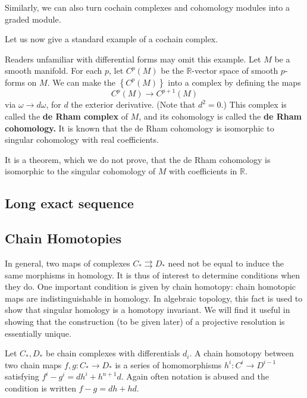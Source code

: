 Similarly, we can also turn cochain complexes and cohomology
modules into a
graded module.

Let us now give a standard example of a cochain complex.
\begin{example} Readers unfamiliar with differential
forms may omit this example. Let $M$ be a smooth manifold. For each $p$, let
$C^p(M)$ be the $\mathbb{R}$-vector space of smooth $p$-forms on $M$.
We can make the $\left\{C^p(M)\right\}$ into a complex by defining the maps
\[ C^p(M) \to C^{p+1}(M)  \]
via $\omega \to d \omega$, for $d$ the exterior derivative. 
(Note that $d^2 = 0$.)  This complex is called the \textbf{de Rham complex} of
$M$, and its cohomology is called the \textbf{de Rham cohomology.} It is known
that the de Rham cohomology is isomorphic to singular cohomology with real
coefficients. 

It is a theorem, which we do not prove, that the de Rham cohomology is
isomorphic to the singular cohomology of $M$ with coefficients in $\mathbb{R}$.
\end{example} 

\subsection{Long exact sequence}

\subsection{Chain Homotopies}

In general, two maps of complexes $C_* \rightrightarrows D_*$ need not be
equal to induce the same morphisms in homology. It is thus of interest to
determine conditions when they do. One important condition is given by chain
homotopy: chain homotopic maps are indistinguishable in homology. In algebraic
topology, this fact is used to show that singular homology is a homotopy
invariant.
We will find it useful in showing that the construction (to be given later) of a
projective resolution is essentially unique.

\begin{definition} Let $C_*, D_*$ be chain complexes with differentials $d_i$. A chain homotopy between two chain maps
$f,g:C_*\rightarrow D_*$ is a series of homomorphisms
$h^i:C^i\rightarrow D^{i-1}$ satisfying $f^i-g^i=d h^i+
h^{n+1}d$. Again often notation is abused and the
condition is written $f-g=d h +
hd$.
\end{definition}

